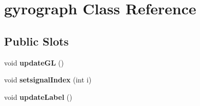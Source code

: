 \hypertarget{classgyrograph}{\section{gyrograph Class Reference}
\label{classgyrograph}
}
\subsection*{Public Slots}
\begin{DoxyCompactItemize}
\item 
\hypertarget{classgyrograph_a812895cb7101fa66e242a40a5073ab96}{void {\bfseries update\-G\-L} ()}\label{classgyrograph_a812895cb7101fa66e242a40a5073ab96}

\item 
\hypertarget{classgyrograph_a6ff55859a490a114d773d7a8e6c071ed}{void {\bfseries setsignal\-Index} (int i)}\label{classgyrograph_a6ff55859a490a114d773d7a8e6c071ed}

\item 
\hypertarget{classgyrograph_a5c62e6d8aa3058da79ab52da3a499aa6}{void {\bfseries update\-Label} ()}\label{classgyrograph_a5c62e6d8aa3058da79ab52da3a499aa6}

\end{DoxyCompactItemize}
